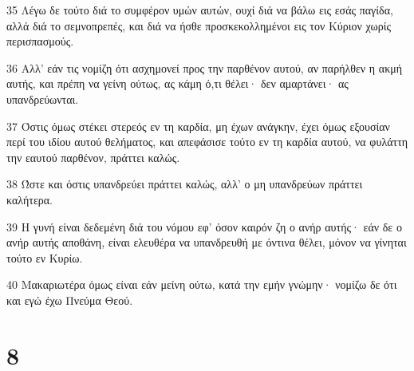 \par 35 Λέγω δε τούτο διά το συμφέρον υμών αυτών, ουχί διά να βάλω εις εσάς παγίδα, αλλά διά το σεμνοπρεπές, και διά να ήσθε προσκεκολλημένοι εις τον Κύριον χωρίς περισπασμούς.
\par 36 Αλλ' εάν τις νομίζη ότι ασχημονεί προς την παρθένον αυτού, αν παρήλθεν η ακμή αυτής, και πρέπη να γείνη ούτως, ας κάμη ό,τι θέλει· δεν αμαρτάνει· ας υπανδρεύωνται.
\par 37 Όστις όμως στέκει στερεός εν τη καρδία, μη έχων ανάγκην, έχει όμως εξουσίαν περί του ιδίου αυτού θελήματος, και απεφάσισε τούτο εν τη καρδία αυτού, να φυλάττη την εαυτού παρθένον, πράττει καλώς.
\par 38 Ώστε και όστις υπανδρεύει πράττει καλώς, αλλ' ο μη υπανδρεύων πράττει καλήτερα.
\par 39 Η γυνή είναι δεδεμένη διά του νόμου εφ' όσον καιρόν ζη ο ανήρ αυτής· εάν δε ο ανήρ αυτής αποθάνη, είναι ελευθέρα να υπανδρευθή με όντινα θέλει, μόνον να γίνηται τούτο εν Κυρίω.
\par 40 Μακαριωτέρα όμως είναι εάν μείνη ούτω, κατά την εμήν γνώμην· νομίζω δε ότι και εγώ έχω Πνεύμα Θεού.

\chapter{8}

